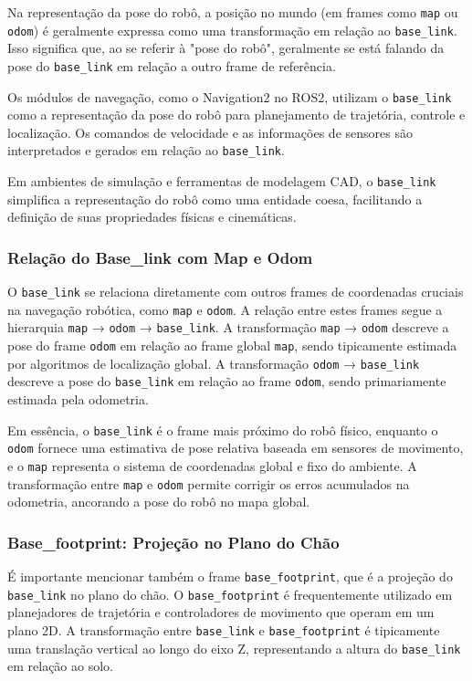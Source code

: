 Na representação da pose do robô, a posição no mundo (em frames como
\texttt{map} ou \texttt{odom}) é geralmente expressa como uma transformação em
relação ao \texttt{base\_link}. Isso significa que, ao se referir à "pose do
robô", geralmente se está falando da pose do \texttt{base\_link} em relação a
outro frame de referência.

Os módulos de navegação, como o Navigation2 no ROS2, utilizam o
\texttt{base\_link} como a representação da pose do robô para planejamento de
trajetória, controle e localização. Os comandos de velocidade e as informações
de sensores são interpretados e gerados em relação ao \texttt{base\_link}.

Em ambientes de simulação e ferramentas de modelagem CAD, o \texttt{base\_link}
simplifica a representação do robô como uma entidade coesa, facilitando a
definição de suas propriedades físicas e cinemáticas.

\subsubsection{Relação do Base\_link com Map e Odom}

O \texttt{base\_link} se relaciona diretamente com outros frames de coordenadas
cruciais na navegação robótica, como \texttt{map} e \texttt{odom}. A relação
entre estes frames segue a hierarquia \texttt{map} → \texttt{odom} →
\texttt{base\_link}. A transformação \texttt{map} → \texttt{odom} descreve a
pose do frame \texttt{odom} em relação ao frame global \texttt{map}, sendo
tipicamente estimada por algoritmos de localização global. A transformação
\texttt{odom} → \texttt{base\_link} descreve a pose do \texttt{base\_link} em
relação ao frame \texttt{odom}, sendo primariamente estimada pela odometria.

Em essência, o \texttt{base\_link} é o frame mais próximo do robô físico,
enquanto o \texttt{odom} fornece uma estimativa de pose relativa baseada em
sensores de movimento, e o \texttt{map} representa o sistema de coordenadas
global e fixo do ambiente. A transformação entre \texttt{map} e \texttt{odom}
permite corrigir os erros acumulados na odometria, ancorando a pose do robô no
mapa global.

\subsubsection{Base\_footprint: Projeção no Plano do Chão}

É importante mencionar também o frame \texttt{base\_footprint}, que é a projeção do \texttt{base\_link} no plano do chão. O \texttt{base\_footprint} é frequentemente utilizado em planejadores de trajetória e controladores de movimento que operam em um plano 2D. A transformação entre \texttt{base\_link} e \texttt{base\_footprint} é tipicamente uma translação vertical ao longo do eixo Z, representando a altura do \texttt{base\_link} em relação ao solo.

